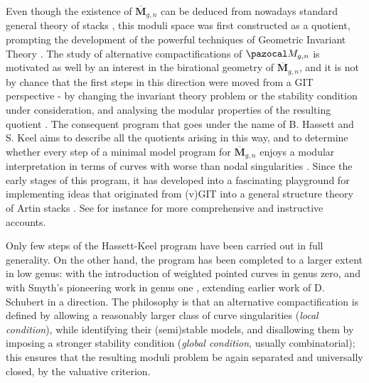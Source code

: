 \documentclass[11pt]{amsart}
\theoremstyle{plain}
\theoremstyle{definition}
\begin{document}
Even though the existence of $\overline{\mathbf M}_{g,n}$ can be deduced from nowadays standard general theory of stacks \cite{KM}, this moduli space was first constructed as a quotient, prompting the development of the powerful techniques of Geometric Invariant Theory  \cite{Gieseker,GIT,BalSwi}. The study of alternative compactifications of $\pazocal M_{g,n}$ is motivated as well by an interest in the birational geometry of $\overline{\mathbf M}_{g,n}$, and it is not by chance that the first steps in this direction were moved from a GIT perspective - by changing the invariant theory problem or the stability condition under consideration, and analysing the modular properties of the resulting quotient \cite{Schubert,Hassettg2}. The consequent program that goes under the name of B. Hassett and S. Keel aims to describe all the quotients arising in this way, and to determine whether every step of a minimal model program for $\overline{\mathbf M}_{g,n}$ enjoys a modular interpretation in terms of curves with worse than nodal singularities \cite{CTV1,CTV2}. Since the early stages of this program, it has developed into a fascinating playground for implementing ideas that originated from (v)GIT into a general structure theory of Artin stacks \cite{AlperKresch,AFS1,AFS2,AFS3}. See for instance \cite{Morrison, FS} for more comprehensive and instructive accounts.

Only few steps of the Hassett-Keel program have been carried out in full generality. On the other hand, the program has been completed to a larger extent in low genus: with the introduction of weighted pointed curves \cite{Hassettweighted} in genus zero, and with Smyth's pioneering work in genus one \cite{SMY1,SMY2,SMY3}, extending earlier work of D. Schubert in a direction. The philosophy is that an alternative compactification is defined by allowing a reasonably larger class of curve singularities (\emph{local condition}), while identifying their (semi)stable models, and disallowing them by imposing a stronger stability condition (\emph{global condition}, usually combinatorial); this ensures that the resulting moduli problem be again separated and universally closed, by the valuative criterion.
\end{document}
